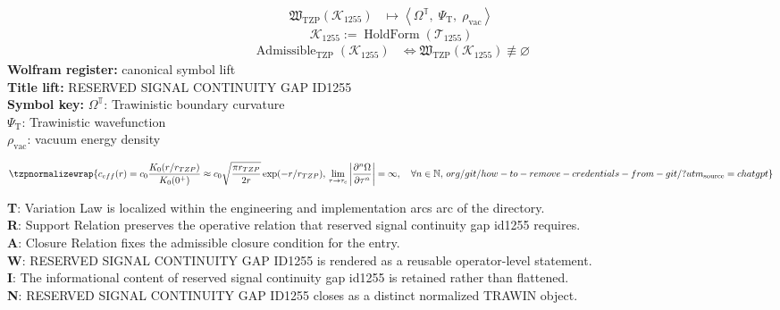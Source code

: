 \noindent
\begin{minipage}[t]{0.48\linewidth}
\begingroup
\small
\[
\begin{aligned}
\mathfrak{W}_{\mathrm{TZP}}\!\left(\mathcal{K}_{1255}\right)
&\longmapsto
\left\langle \Omega^{\mathbb{T}},\; \Psi_{\mathrm{T}},\; \rho_{\mathrm{vac}} \right\rangle
\end{aligned}
\]
\[
\mathcal{K}_{1255}
:=
\operatorname{HoldForm}\!\left(\mathcal{T}_{1255}\right)
\]
\[
\begin{aligned}
\operatorname{Admissible}_{\mathrm{TZP}}\!\left(\mathcal{K}_{1255}\right)
&\Longleftrightarrow
\mathfrak{W}_{\mathrm{TZP}}\!\left(\mathcal{K}_{1255}\right)\not\equiv\varnothing
\end{aligned}
\]
\textbf{Wolfram register:} canonical symbol lift\\
\textbf{Title lift:} RESERVED SIGNAL CONTINUITY GAP ID1255\\
\textbf{Symbol key:} \(\Omega^{\mathbb{T}}\): Trawinistic boundary curvature\\ \(\Psi_{\mathrm{T}}\): Trawinistic wavefunction\\ \(\rho_{\mathrm{vac}}\): vacuum energy density
\par
\endgroup
\end{minipage}\hfill
\begin{minipage}[t]{0.48\linewidth}
\[
\tzpnormalizewrap{c_{eff}(r) = c_0 \frac{K_0(r/r_{TZP})}{K_0(0^+)} \approx c_0 \sqrt{\frac{\pi r_{TZP}}{2r}} \exp(-r/r_{TZP}),\,\lim_{\tau \to \tau_c} \left| \frac{\partial^n \Omega}{\partial \tau^n} \right| = \infty, \quad \forall n \in \mathbb{N},\,org/git/how-to-remove-credentials-from-git/?utm_{\mathrm{source}}=chatgpt}
\]

\small
\textbf{T}: Variation Law is localized within the engineering and implementation arcs arc of the directory.\\
\textbf{R}: Support Relation preserves the operative relation that reserved signal continuity gap id1255 requires.\\
\textbf{A}: Closure Relation fixes the admissible closure condition for the entry.\\
\textbf{W}: RESERVED SIGNAL CONTINUITY GAP ID1255 is rendered as a reusable operator-level statement.\\
\textbf{I}: The informational content of reserved signal continuity gap id1255 is retained rather than flattened.\\
\textbf{N}: RESERVED SIGNAL CONTINUITY GAP ID1255 closes as a distinct normalized TRAWIN object.
\normalsize
\end{minipage}

